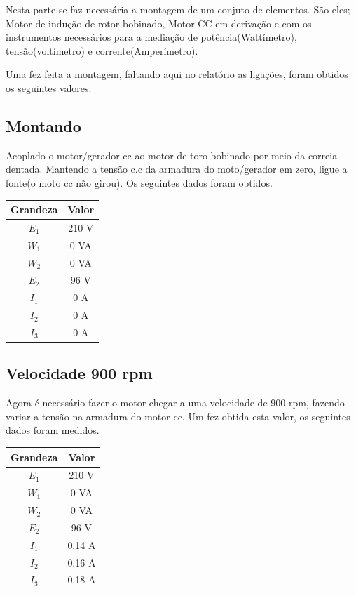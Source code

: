 \documentclass[paper=a4, fontsize=11pt]{article}
\begin{document}
Nesta parte se faz necessária a montagem de um 
conjuto de elementos. São eles; Motor de indução de rotor
bobinado, Motor CC em derivação e com os instrumentos
necessários para a mediação de potência(Wattímetro), 
tensão(voltímetro) e corrente(Amperímetro).

Uma fez feita a montagem, faltando aqui no relatório as 
ligações, foram obtidos os seguintes valores.


\subsection{Montando}

Acoplado o motor/gerador cc ao motor de toro bobinado por meio
da correia dentada. Mantendo a tensão c.c da armadura do 
moto/gerador em zero, ligue a fonte(o moto cc não girou).
Os seguintes dados foram obtidos. 

\begin{center}
    \begin{tabular}{c|c}
            Grandeza & Valor  \\
            \hline
            $E_1$ & 210 V \\
            $W_1$ & 0  VA\\
            $W_2$ & 0  VA\\
            $E_2$ & 96 V \\
            $I_1$ & 0 A \\
            $I_2$ & 0 A \\
            $I_3$ & 0 A\\
    \end{tabular}
\end{center}

\subsection{Velocidade 900 rpm}

Agora é necessário fazer o motor chegar a 
uma velocidade de 900 rpm, fazendo variar
a tensão na armadura do motor cc.
Um fez obtida esta valor, os seguintes
dados foram medidos.

\begin{center}
    \begin{tabular}{c|c}
            Grandeza & Valor  \\
            \hline
            $E_1$ & 210 V \\
            $W_1$ & 0  VA \\
            $W_2$ & 0  VA \\
            $E_2$ & 96 V\\
            $I_1$ & 0.14 A\\
            $I_2$ & 0.16 A \\
            $I_3$ & 0.18 A \\
    \end{tabular}
\end{center}
\end{document}
